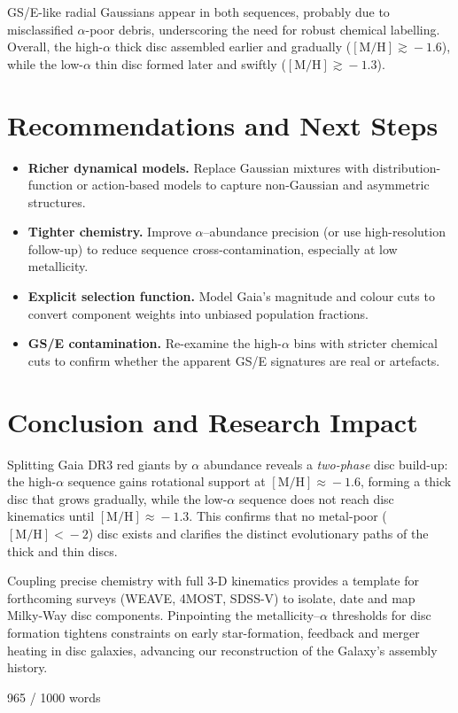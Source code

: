 \documentclass[a4paper,10pt]{article}
\begin{document}
\begin{multicols}{2}
GS/E-like radial Gaussians appear in both sequences, probably due to misclassified $\alpha$-poor debris, underscoring the need for robust chemical labelling.  
Overall, the high-$\alpha$ thick disc assembled earlier and gradually (\mbox{$\mathrm{[M/H]}\!\gtrsim\!-1.6$}), while the low-$\alpha$ thin disc formed later and swiftly (\mbox{$\mathrm{[M/H]}\!\gtrsim\!-1.3$}).



\section*{Recommendations and Next Steps}

\begin{itemize}
\item \textbf{Richer dynamical models.} Replace Gaussian mixtures with distribution-function or action-based models to capture non-Gaussian and asymmetric structures.  
\item \textbf{Tighter chemistry.} Improve $\alpha$–abundance precision (or use high-resolution follow-up) to reduce sequence cross-contamination, especially at low metallicity.  
\item \textbf{Explicit selection function.} Model Gaia’s magnitude and colour cuts to convert component weights into unbiased population fractions.  
\item \textbf{GS/E contamination.} Re-examine the high-$\alpha$ bins with stricter chemical cuts to confirm whether the apparent GS/E signatures are real or artefacts.  
\end{itemize}

\section*{Conclusion and Research Impact}

Splitting Gaia DR3 red giants by $\alpha$ abundance reveals a \emph{two-phase} disc build-up:  
the high-$\alpha$ sequence gains rotational support at $\mathrm{[M/H]}\!\approx\!-1.6$, forming 
a thick disc that grows gradually, while the low-$\alpha$ sequence does not reach disc 
kinematics until $\mathrm{[M/H]}\!\approx\!-1.3$. This confirms that no metal-poor 
($\mathrm{[M/H]}\!<\!-2$) disc exists and clarifies the distinct evolutionary paths of 
the thick and thin discs.  

Coupling precise chemistry with full 3-D kinematics provides a template for forthcoming surveys 
(WEAVE, 4MOST, SDSS-V) to isolate, date and map Milky-Way disc components. Pinpointing the 
metallicity–$\alpha$ thresholds for disc formation tightens constraints on early star-formation, 
feedback and merger heating in disc galaxies, advancing our reconstruction of the Galaxy’s 
assembly history.  


\newpage{}

965 / 1000 words








  


\end{multicols}
\end{document}
